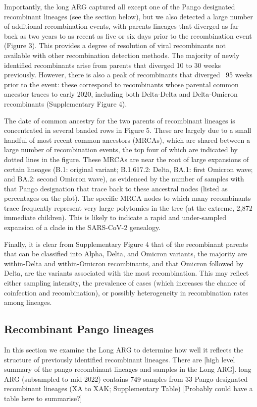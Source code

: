 \documentclass{article}
\begin{document}
Importantly, the long ARG captured all except one of the Pango designated
recombinant lineages (see the section below), but we also detected a large
number of additional recombination events, with parents lineages that diverged
as far back as two years to as recent as five or six days prior to the
recombination event (Figure 3). This provides a degree of resolution of viral
recombinants not available with other recombination detection methods. The
majority of newly identified recombinants arise from parents that diverged 10
to 30 weeks previously. However, there is also a peak of recombinants that
diverged ~95 weeks prior to the event: these correspond to recombinants whose
parental common ancestor traces to early 2020, including both Delta-Delta and
Delta-Omicron recombinants (Supplementary Figure 4).

The date of common ancestry for the two parents of recombinant lineages is
concentrated in several banded rows in Figure 5. These are largely due to a
small handful of most recent common ancestors (MRCAs), which are shared between
a large number of recombination events, the top four of which are indicated by
dotted lines in the figure. These MRCAs are near the root of large expansions
of certain lineages (B.1: original variant;  B.1.617.2: Delta, BA.1: first
Omicron wave; and BA.2: second Omicron wave), as evidenced by the number of
samples with that Pango designation that trace back to these ancestral nodes
(listed as percentages on the plot). The specific MRCA nodes to which many
recombinants trace frequently represent very large polytomies in the tree (at
the extreme, 2,872 immediate children). This is likely to indicate a rapid and
under-sampled expansion of a clade in the SARS-CoV-2 genealogy.

Finally, it is clear from Supplementary Figure 4 that of the recombinant
parents that can be classified into Alpha, Delta, and Omicron variants, the
majority are within-Delta and within-Omicron recombinants, and that Omicron
followed by Delta, are the variants associated with the most recombination.
This may reflect either sampling intensity, the prevalence of cases (which
increases the chance of coinfection and recombination), or possibly
heterogeneity in recombination rates among lineages.

\subsection{Recombinant Pango lineages}

In this section we examine the Long ARG to determine how well it reflects
the structure of previously identified recombinant lineages.
There are [high level summary of the pango recombinant lineages and samples
in the Long ARG].
long ARG (subsampled to mid-2022) contains 749 samples
from 33 Pango-designated recombinant lineages (XA to XAK; Supplementary Table)
[Probably could have a table here to summarise?]
\end{document}
